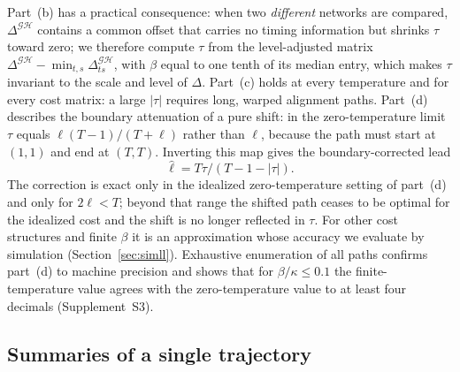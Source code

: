 \documentclass[12pt]{article}
\theoremstyle{definition}
\begin{document}
Part~(b) has a practical consequence: when two \emph{different} networks are compared, $\Delta^{\mathcal G\mathcal H}$ contains a common offset that carries no timing information but shrinks $\tau$ toward zero; we therefore compute $\tau$ from the level-adjusted matrix $\Delta^{\mathcal G\mathcal H}-\min_{t,s}\Delta^{\mathcal G\mathcal H}_{ts}$, with $\beta$ equal to one tenth of its median entry, which makes $\tau$ invariant to the scale and level of $\Delta$. Part~(c) holds at every temperature and for every cost matrix: a large $|\tau|$ requires long, warped alignment paths. Part~(d) describes the boundary attenuation of a pure shift: in the zero-temperature limit $\tau$ equals $\ell(T-1)/(T+\ell)$ rather than $\ell$, because the path must start at $(1,1)$ and end at $(T,T)$. Inverting this map gives the boundary-corrected lead
\begin{equation}\label{eq:corrected}
\hat\ell=T\tau/(T-1-|\tau|).
\end{equation}
The correction is exact only in the idealized zero-temperature setting of part~(d) and only for $2\ell<T$; beyond that range the shifted path ceases to be optimal for the idealized cost and the shift is no longer reflected in $\tau$. For other cost structures and finite $\beta$ it is an approximation whose accuracy we evaluate by simulation (Section~\ref{sec:simll}). Exhaustive enumeration of all paths confirms part~(d) to machine precision and shows that for $\beta/\kappa\le0.1$ the finite-temperature value agrees with the zero-temperature value to at least four decimals (Supplement~S3).

\subsection{Summaries of a single trajectory}\label{sec:summaries}
\end{document}
